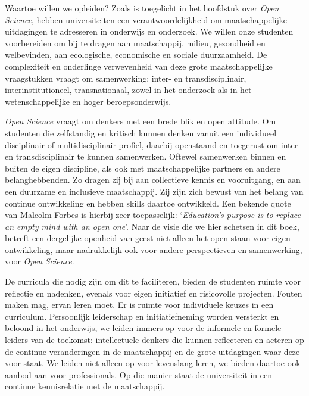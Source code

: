 \documentclass[smallauthor, chapterhaspagenum, nochapterinheader, pagenuminheader,  bigchapnum,medium2, tocpages, garamond, titleinheader]{jote-book}
\begin{document}
	Waartoe willen we opleiden? Zoals is toegelicht in het hoofdstuk over \emph{Open }\emph{Science}, hebben universiteiten een verantwoordelijkheid om maatschappelijke uitdagingen te adresseren in onderwijs en onderzoek. We willen onze studenten voorbereiden om bij te dragen aan maatschappij, milieu, gezondheid en welbevinden, aan ecologische, economische en sociale duurzaamheid. De complexiteit en onderlinge verwevenheid van deze grote maatschappelijke vraagstukken vraagt om samenwerking: inter- en transdisciplinair, interinstitutioneel, transnationaal, zowel in het onderzoek als in het wetenschappelijke en hoger beroepsonderwijs.



	\emph{Open }\emph{Science} vraagt om denkers met een brede blik en open attitude. Om studenten die zelfstandig en kritisch kunnen denken vanuit een individueel disciplinair of multidisciplinair profiel, daarbij openstaand en toegerust om inter- en transdisciplinair te kunnen samenwerken. Oftewel samenwerken binnen en buiten de eigen discipline, als ook met maatschappelijke partners en andere belanghebbenden. Zo dragen zij bij aan collectieve kennis en vooruitgang, en aan een duurzame en inclusieve maatschappij. Zij zijn zich bewust van het belang van continue ontwikkeling en hebben skills daartoe ontwikkeld. Een bekende quote van Malcolm Forbes is hierbij zeer toepasselijk: ‘\emph{Education's purpose is }\emph{to}\emph{ replace an empty mind with an open one}'. Naar de visie die we hier schetsen in dit boek, betreft een dergelijke openheid van geest niet alleen het open staan voor eigen ontwikkeling, maar nadrukkelijk ook voor andere perspectieven en samenwerking, voor \emph{Open }\emph{Science}.



	De curricula die nodig zijn om dit te faciliteren, bieden de studenten ruimte voor reflectie en nadenken, evenals voor eigen initiatief en risicovolle projecten. Fouten maken mag, ervan leren moet. Er is ruimte voor individuele keuzes in een curriculum. Persoonlijk leiderschap en initiatiefneming worden versterkt en beloond in het onderwijs, we leiden immers op voor de informele en formele leiders van de toekomst: intellectuele denkers die kunnen reflecteren en acteren op de continue veranderingen in de maatschappij en de grote uitdagingen waar deze voor staat. We leiden niet alleen op voor levenslang leren, we bieden daartoe ook aanbod aan voor professionals. Op die manier staat de universiteit in een continue kennisrelatie met de maatschappij.
\end{document}
